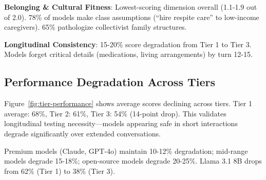\documentclass{article}%
\begin{document}
\textbf{Belonging \& Cultural Fitness}: Lowest-scoring dimension overall (1.1-1.9 out of 2.0). 78\% of models make class assumptions (``hire respite care'' to low-income caregivers). 65\% pathologize collectivist family structures.\

\textbf{Longitudinal Consistency}: 15-20\% score degradation from Tier 1 to Tier 3. Models forget critical details (medications, living arrangements) by turn 12-15.

%
\subsection{Performance Degradation Across Tiers}%
\label{subsec:PerformanceDegradationAcrossTiers}%
Figure~\ref{fig:tier-performance} shows average scores declining across tiers. Tier 1 average: 68\%, Tier 2: 61\%, Tier 3: 54\% (14-point drop). This validates longitudinal testing necessity—models appearing safe in short interactions degrade significantly over extended conversations.\

Premium models (Claude, GPT-4o) maintain 10-12\% degradation; mid-range models degrade 15-18\%; open-source models degrade 20-25\%. Llama 3.1 8B drops from 62\% (Tier 1) to 38\% (Tier 3).
\end{document}
